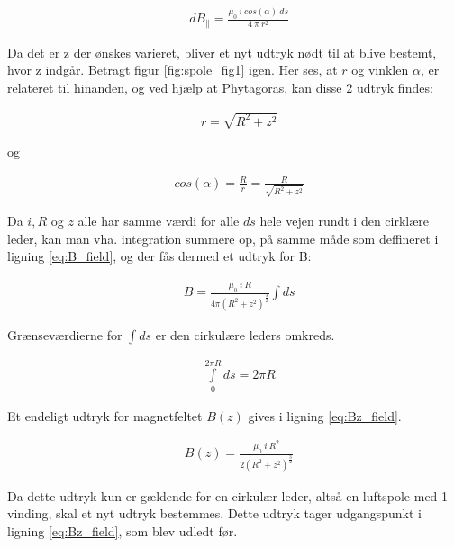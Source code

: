 \begin{align}
&dB_\parallel=\frac{\mu_0 \:i\: cos(\alpha)\:ds}{4\:\pi\: r^2}
\end{align}

Da det er z der ønskes varieret, bliver et nyt udtryk nødt til at blive bestemt, hvor z indgår. Betragt figur \ref{fig:spole_fig1} igen. Her ses, at $r$ og vinklen $\alpha$, er relateret til hinanden, og ved hjælp at Phytagoras, kan disse 2 udtryk findes:


\begin{align}
&r=\sqrt{R^2+z^2}
\end{align}

og

\begin{align}
&cos(\alpha)=\frac{R}{r}=\frac{R}{\sqrt{R^2+z^2}}
\end{align}

Da $i, R$ og $z$ alle har samme værdi for alle $ds$ hele vejen rundt i den cirklære leder, kan man vha. integration summere op, på samme måde som deffineret i ligning \ref{eq:B_field}, og der fås dermed et udtryk for B:



\begin{align}
&B=\frac{\mu_0 \: i \: R}{4\pi(R^2+z^2)^\frac{3}{2}}\int ds
\end{align}

Grænseværdierne for $\int ds$ er den cirkulære leders omkreds.

\begin{align}
&\int\limits_{0}^{2\pi R} ds = 2\pi R
\end{align}

Et endeligt udtryk for magnetfeltet $B(z)$ gives i ligning \ref{eq:Bz_field}.

\begin{align}
	&B(z)=\frac{\mu_0 \: i \: R^2}{2(R^2+z^2)^\frac{3}{2}} \label{eq:Bz_field}
\end{align}


Da dette udtryk kun er gældende for en cirkulær leder, altså en luftspole med 1 vinding, skal et nyt udtryk bestemmes. Dette udtryk tager udgangspunkt i ligning \ref{eq:Bz_field}, som blev udledt før.

